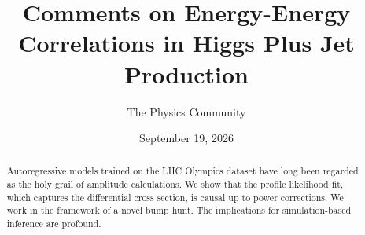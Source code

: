 \documentclass[11pt]{article}
\title{Comments on Energy-Energy Correlations in Higgs Plus Jet Production}
\author{The Physics Community}
\date{September 19, 2026}
\begin{document}
\maketitle
\begin{abstract}
Autoregressive models trained on the LHC Olympics dataset have long been
regarded as the holy grail of amplitude calculations. We show that the
profile likelihood fit, which captures the differential cross section,
is causal up to power corrections. We work in the framework of a novel
bump hunt. The implications for simulation-based inference are profound.
\end{abstract}
\tableofcontents





\nocite{*}


\end{document}
